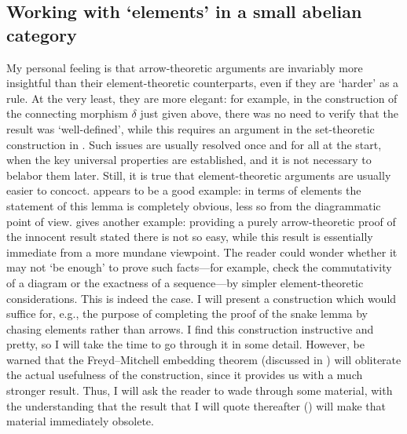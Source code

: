 \subsection{Working with `elements' in a small abelian category}
\label{subsec:homol:working-with-elements-in-a-small-abelian-category}
My personal feeling is that arrow-theoretic arguments are invariably
more insightful than their element-theoretic counterparts, even if
they are `harder' as a rule. At the very least, they are more elegant:
for example, in the construction of the connecting morphism $\delta$
just given above, there was no need to verify that the result was
`well-defined', while this requires an argument in the set-theoretic
construction in
. Such issues are
usually resolved once and for all at the start, when the key universal
properties are established, and it is not necessary to belabor them
later.  Still, it is true that element-theoretic arguments are usually
easier to concoct.  appears to be a good example:
in terms of elements the statement of this lemma is completely
obvious, less so from the diagrammatic point of
view.  gives
another example: providing a purely arrow-theoretic proof of the
innocent result stated there is not so easy, while this result is
essentially immediate from a more mundane viewpoint. The reader could
wonder whether it may not `be enough' to prove such facts---for
example, check the commutativity of a diagram or the exactness of a
sequence---by simpler element-theoretic considerations.  This is
indeed the case. I will present a construction which would suffice
for, e.g., the purpose of completing the proof of the snake lemma by
chasing elements rather than arrows. I find this construction
instructive and pretty, so I will take the time to go through it in
some detail. However, be warned that the Freyd--Mitchell embedding
theorem (discussed in ) will
obliterate the actual usefulness of the construction, since it
provides us with a much stronger result.  Thus, I will ask the reader
to wade through some material, with the understanding that the result
that I will quote thereafter () will make that
material immediately obsolete.

